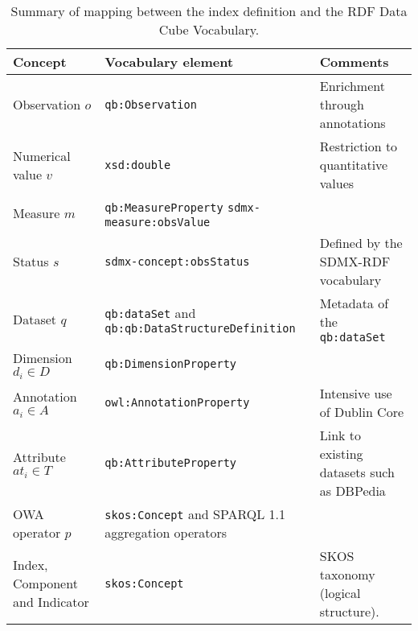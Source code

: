 \begin{table}[!htb]
\renewcommand{\arraystretch}{1.3}
\begin{center}
\begin{tabular}{|p{3cm}||p{4.8cm}|p{4.5cm}|}
\hline
  \textbf{Concept} & \textbf{Vocabulary element} &  \textbf{Comments}  \\  \hline
   Observation $o$ & \texttt{qb:Observation} &  Enrichment through annotations\\ \hline
   Numerical value $v$ & \texttt{xsd:double} & Restriction to quantitative values  \\ \hline
   Measure $m$ & \texttt{qb:MeasureProperty} \texttt{sdmx-measure:obsValue} & \\ \hline
   Status $s$ & \texttt{sdmx-concept:obsStatus} & Defined by the SDMX-RDF vocabulary\\ \hline
   Dataset $q$ & \texttt{qb:dataSet} and \texttt{qb:qb:DataStructureDefinition} &  Metadata of the \texttt{qb:dataSet}\\ \hline
   Dimension $d_i \in D$ & \texttt{qb:DimensionProperty} &  \\ \hline
   Annotation $a_i \in A$ & \texttt{owl:AnnotationProperty} &  Intensive use of Dublin Core\\ \hline
   Attribute $at_i \in T$ & \texttt{qb:AttributeProperty} & Link to existing datasets such as DBPedia \\ \hline
   OWA operator $p$ &  \texttt{skos:Concept} and SPARQL 1.1 aggregation operators &  \\ \hline
   Index, Component and Indicator & \texttt{skos:Concept} & SKOS taxonomy (logical structure). \\ \hline
  \hline
  \end{tabular}
  \caption{Summary of mapping between the index definition and the RDF Data Cube Vocabulary.}
  \label{index-to-rdf}
  \end{center}
\end{table} 


